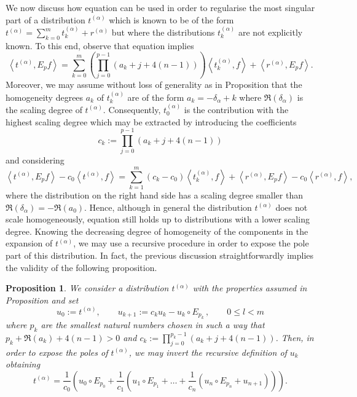 \documentclass[10pt]{book}
\theoremstyle{break}
\newtheorem{proposition}{Proposition}
\begin{document}
We now discuss how equation %
can be used in order to regularise the most singular part of a distribution 
$t^{(\alpha)}$ which is known to be of the form $t^{(\alpha)} = \sum_{k=0}^m t^{(\alpha)}_k + r^{(\alpha)}$ but where the distributions $ t^{(\alpha)}_k$ are not explicitly known. To this end, observe that equation %
implies
\[
\left\langle t^{(\alpha)}, E_p f \right\rangle = 
\sum_{k=0}^m \left(\prod_{j=0}^{p-1} (a_k+j+4(n-1)) \right)  \left\langle t^{(\alpha)}_k, f \right\rangle + \left\langle r^{(\alpha)},E_p f\right\rangle.
\]
Moreover, we may assume without loss of generality as in Proposition %
that the homogeneity degrees $a_k$ of $t^{(\alpha)}_k$ are of the form $a_k=-\delta_\alpha + k$ where $\Re(\delta_\alpha)$ is the scaling degree of $t^{(\alpha)}$. Consequently, $t^{(\alpha)}_0$ is the contribution with the highest scaling degree which may be extracted by introducing the coefficients
\[
c_k:=\prod_{j=0}^{p-1} \left(a_k+j+4(n-1)\right)
\]
and considering 
%
\begin{equation}
\left\langle t^{(\alpha)}, E_p f \right\rangle - c_0   \left\langle t^{(\alpha)}, f \right\rangle   =
\sum_{k=1}^m (c_k-c_0)   \left\langle t^{(\alpha)}_k, f \right\rangle +  \left\langle r^{(\alpha)}, E_p f \right\rangle - c_0 \left\langle r^{(\alpha)}, f \right\rangle,
\end{equation}
%
where the distribution on the right hand side has a scaling degree smaller than $\Re(\delta_\alpha) = - \Re (a_0)$. Hence, although in general the distribution $t^{(\alpha)}$ does not scale homogeneously, equation %
still holds up to distributions with a lower scaling degree. Knowing the decreasing degree of homogeneity of the components in the expansion of $t^{(\alpha)}$, we may use a recursive procedure in order to expose the pole part of this distribution. In fact, the previous discussion straightforwardly implies the validity of the following proposition.


\begin{proposition}
We consider a distribution $t^{(\alpha)}$ with the properties assumed in Proposition %
and set
\[
u_0 := t^{(\alpha)},\qquad    u_{k+1} :=  c_k u_k -  u_k \circ E_{p_k}\,  , \qquad 0\le l< m
\]
where $p_k$ are the smallest natural numbers chosen in such a way that $p_k+\Re (a_k)+4(n-1)>0$ and $c_k :=\prod_{j=0}^{p_k-1} \left(a_k+j+4(n-1)\right)$.
Then, in order to expose the poles of $t^{(\alpha)}$, we may invert the recursive definition of $u_k$ obtaining
\begin{equation}
t^{(\alpha)} = \frac{1}{c_0} \left( u_0\circ E_{p_0} +  \frac{1}{c_1} \left( u_1 \circ E_{p_1} +\dots +\frac{1}{c_n}\left(  u_n \circ E_{p_n}+ u_{n+1}   \right)   \right)\right).
\end{equation}
\end{proposition}
\end{document}
